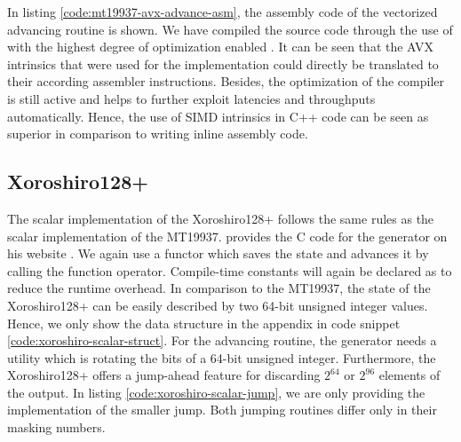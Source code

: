 \documentclass{stdlocal}
\begin{document}
    In listing \ref{code:mt19937-avx-advance-asm}, the assembly code of the vectorized advancing routine is shown.
    We have compiled the source code through the use of  with the highest degree of optimization enabled \autocite{compiler-explorer}.
    It can be seen that the AVX intrinsics that were used for the implementation could directly be translated to their according assembler instructions.
    Besides, the optimization of the compiler is still active and helps to further exploit latencies and throughputs automatically.
    Hence, the use of SIMD intrinsics in C++ code can be seen as superior in comparison to writing inline assembly code.

  \subsection{Xoroshiro128+} %
  \label{sub:xoroshiro}
    The scalar implementation of the Xoroshiro128+ follows the same rules as the scalar implementation of the MT19937.
    \citeauthor{vigna-xoroshiro} provides the C code for the generator on his website \autocite{vigna-xoroshiro}.
    We again use a functor which saves the state and advances it by calling the function operator.
    Compile-time constants will again be declared as  to reduce the runtime overhead.
    In comparison to the MT19937, the state of the Xoroshiro128+ can be easily described by two 64-bit unsigned integer values.
    Hence, we only show the data structure in the appendix in code snippet \ref{code:xoroshiro-scalar-struct}.
    For the advancing routine, the generator needs a utility which is rotating the bits of a 64-bit unsigned integer.
    Furthermore, the Xoroshiro128+ offers a jump-ahead feature for discarding $2^{64}$ or $2^{96}$ elements of the output.
    In listing \ref{code:xoroshiro-scalar-jump}, we are only providing the implementation of the smaller jump.
    Both jumping routines differ only in their masking numbers.
\end{document}
